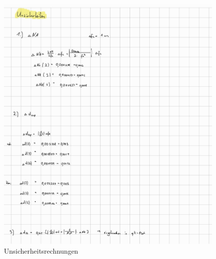 \documentclass[12pt,a4paper,twoside]{article}
\begin{document}
\begin{figure}[H]
    \centering
    \includegraphics[width=0.8\linewidth, angle=0]{nudes/Unsicherheiten1.jpg}
    \caption{Unsicherheitsrechnungen}
    \label{fig:Unsicherheitsrechnungen1}
\end{figure}

\printbibliography[heading=bibintoc]
\end{document}
